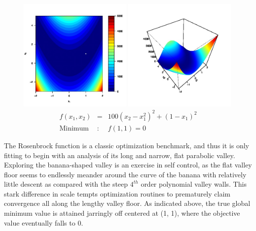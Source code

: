 \documentclass[12pt]{article}
\begin{document}
	\begin{figure}[!h]%
	\centering
	\includegraphics[width=0.49\textwidth]{./figures/roseContour.jpg}
	\includegraphics[width=0.49\textwidth]{./figures/rosePersp.jpg}
	\begin{eqnarray}
	f(x_1, x_2) &=& 100\left(x_2-x_1^2\right)^2 + (1-x_1)^2 \\
	\text{Minimum}&:& f(1, 1)=0\nonumber
	\end{eqnarray}	
	\end{figure}
	
	The Rosenbrock function \cite{rosePaper} is a classic optimization benchmark, and thus it is only fitting to begin with an analysis of its long and narrow, flat parabolic valley.
	Exploring the banana-shaped valley is an exercise in self control, as the flat valley floor seems to endlessly meander around the curve of the banana with relatively little descent as compared with the steep $4^{th}$ order polynomial valley walls.   
	This stark difference in scale tempts optimization routines to prematurely claim convergence all along the lengthy valley floor. 
	As indicated above, the true global minimum value is attained jarringly off centered at (1, 1), where the objective value eventually falls to 0. 
	
\end{document}
